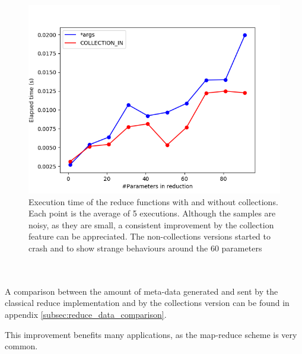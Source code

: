 \begin{figure}[ht!]
\centering
\includegraphics[scale = 0.5]{figures/collection_vs_normal.png}
\caption{Execution time of the reduce functions with and without collections. Each point is the average of 5 executions. Although the samples are noisy, as they are small, a consistent improvement by the collection feature can be appreciated. The non-collections versions started to crash and to show strange behaviours around the 60 parameters}
\label{fig:collection_vs_normal}
\end{figure}\\
\\
A comparison between the amount of meta-data generated and sent by the classical reduce implementation and by the collections version can be found in appendix \ref{subsec:reduce_data_comparison}.

This improvement benefits many applications, as the map-reduce scheme is very common.